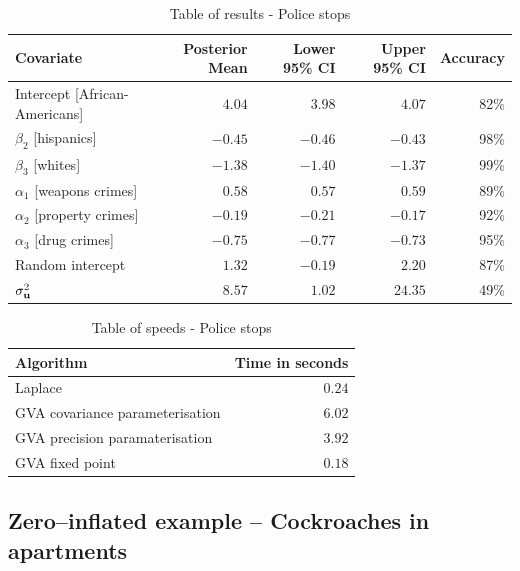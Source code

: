 \begin{table}
	\begin{tabular}{|l|rrrr|}
		\hline
		Covariate                     & Posterior Mean & Lower 95\% CI & Upper 95\% CI & Accuracy \\
		\hline
		Intercept [African-Americans] & $4.04$          & $3.98$           & $4.07$          & 82\%   \\
		$\beta_2$ [hispanics]         & $-0.45$         & $-0.46$          & $-0.43$         & 98\%   \\
		$\beta_3$ [whites]            & $-1.38$         & $-1.40$          & $-1.37$         & 99\%   \\
		$\alpha_1$ [weapons crimes]   & $0.58$          & $0.57$           & $0.59$          & 89\%   \\
		$\alpha_2$ [property crimes]  & $-0.19$         & $-0.21$          & $-0.17$         & 92\%   \\
		$\alpha_3$ [drug crimes]      & $-0.75$        & $-0.77$          & $-0.73$         & 95\%   \\
		Random intercept              & $1.32$         & $-0.19$         & $2.20$         & 87\%   \\
		$\sigma^2_{{\bf u}}$              & $8.57$          & $1.02$           & $24.35$         & 49\%     \\
		\hline
	\end{tabular}
	\caption{Table of results - Police stops}
	\label{tab:application_police_stops}
\end{table}

\begin{table}
	\begin{tabular}{|l|r|}
		\hline
		Algorithm & Time  in seconds \\
		\hline
		Laplace & $0.24$ \\
		GVA covariance parameterisation & $6.02$ \\
		GVA precision paramaterisation & $3.92$ \\
		GVA fixed point & $0.18$ \\
		\hline
	\end{tabular}
	\caption{Table of speeds - Police stops}
	\label{tab:police_stop_speeds}
\end{table}

\subsection{Zero--inflated example -- Cockroaches in apartments}
\label{sec:cockroaches}

